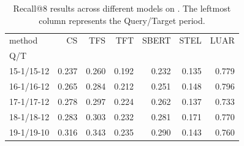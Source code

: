 \begin{table}[th]
    \centering
\begin{tabular}{lrrrrrr}
    \toprule
method & CS & TFS & TFT & SBERT & STEL & LUAR \\
Q/T &  &  &  &  &  &  \\
\midrule
15-1/15-12 & 0.237 & 0.260 & 0.192 & 0.232 & 0.135 & 0.779 \\
16-1/16-12 & 0.265 & 0.284 & 0.212 & 0.251 & 0.148 & 0.796 \\
17-1/17-12 & 0.278 & 0.297 & 0.224 & 0.262 & 0.137 & 0.733 \\
18-1/18-12 & 0.283 & 0.303 & 0.232 & 0.281 & 0.171 & 0.770 \\
19-1/19-10 & 0.316 & 0.343 & 0.235 & 0.290 & 0.143 & 0.760 \\
\bottomrule
\end{tabular}
    \caption{Recall@8 results across different models on \DSfixeddelta{}. The leftmost column represents the Query/Target period.}
    \label{tab:temporal_fixed}
\end{table}

